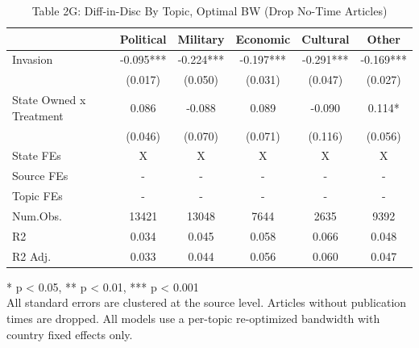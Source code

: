 \begin{table}[!t]
\caption{Table 2G: Diff-in-Disc By Topic, Optimal BW (Drop No-Time Articles)} 
\fontsize{12.0pt}{14.4pt}\selectfont
\begin{tabular*}{\linewidth}{@{\extracolsep{\fill}}lccccc}
\toprule
  & Political & Military & Economic & Cultural & Other \\ 
\midrule\addlinespace[2.5pt]
Invasion & -0.095*** & -0.224*** & -0.197*** & -0.291*** & -0.169*** \\ 
 & (0.017) & (0.050) & (0.031) & (0.047) & (0.027) \\ 
State Owned x Treatment & 0.086 & -0.088 & 0.089 & -0.090 & 0.114* \\ 
{} & {(0.046)} & {(0.070)} & {(0.071)} & {(0.116)} & {(0.056)} \\ 
State FEs & X & X & X & X & X \\ 
Source FEs & - & - & - & - & - \\ 
Topic FEs & - & - & - & - & - \\ 
Num.Obs. & 13421 & 13048 & 7644 & 2635 & 9392 \\ 
R2 & 0.034 & 0.045 & 0.058 & 0.066 & 0.048 \\ 
R2 Adj. & 0.033 & 0.044 & 0.056 & 0.060 & 0.047 \\ 
\bottomrule
\end{tabular*}
\begin{minipage}{\linewidth}
* p < 0.05, ** p < 0.01, *** p < 0.001\\
All standard errors are clustered at the source level. Articles without
publication times are dropped. All models use a per-topic re-optimized bandwidth
with country fixed effects only.\\
\end{minipage}
\end{table}

